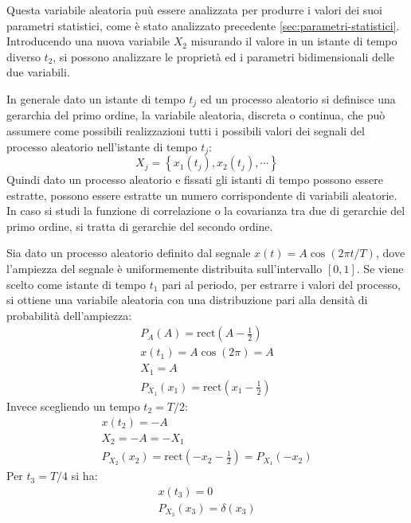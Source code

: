 \documentclass{article}
\newcommand{\rect}{\mathrm{rect}}
\numberwithin{equation}{subsection}
\begin{document}
Questa variabile aleatoria puù essere analizzata per produrre i valori dei suoi parametri statistici, come è stato analizzato precedente \ref{sec:parametri-statistici}. 
Introducendo una nuova variabile $X_2$ misurando il valore in un istante di tempo diverso $t_2$, si possono analizzare le proprietà ed i parametri bidimensionali 
delle due variabili. 

In generale dato un istante di tempo $t_j$ ed un processo aleatorio si definisce una gerarchia del primo ordine, la variabile aleatoria, discreta o continua, che può 
assumere come possibili realizzazioni tutti i possibili valori dei segnali del processo aleatorio nell'istante di tempo $t_j$:
\begin{equation}
    X_j=\left\{x_1(t_j),x_2(t_j),\cdots\right\}
\end{equation}
Quindi dato un processo aleatorio e fissati gli istanti di tempo possono essere estratte, possono essere estratte un numero corrispondente di variabili aleatorie. 
In caso si studi la funzione di correlazione o la covarianza tra due di gerarchie del primo ordine, si tratta di gerarchie del secondo ordine. 


Sia dato un processo aleatorio definito dal segnale $x(t)=A\cos(2\pi t/T)$, dove l'ampiezza del segnale è uniformemente distribuita sull'intervallo $[0,1]$. 
Se viene scelto come istante di tempo $t_1$ pari al periodo, per estrarre i valori del processo, si ottiene una variabile aleatoria con una distribuzione pari alla densità di probabilità 
dell'ampiezza:
\begin{gather*}
    P_A(A)=\rect\displaystyle\left(A-\frac{1}{2}\right)\\
    x(t_1)=A\cos(2\pi)=A\\
    X_1=A\\
    P_{X_1}(x_1)=\displaystyle\rect\left(x_1-\frac{1}{2}\right)
\end{gather*}
Invece scegliendo un tempo $t_2=T/2$:
\begin{gather*}
    x(t_2)=-A\\
    X_2=-A=-X_1\\
    P_{X_2}(x_2)=\displaystyle\rect\left(-x_2-\frac{1}{2}\right)=P_{X_1}(-x_2)
\end{gather*}
Per $t_3=T/4$ si ha:
\begin{gather*}
    x(t_3)=0\\
    P_{X_3}(x_3)=\delta(x_3)
\end{gather*}
\end{document}
